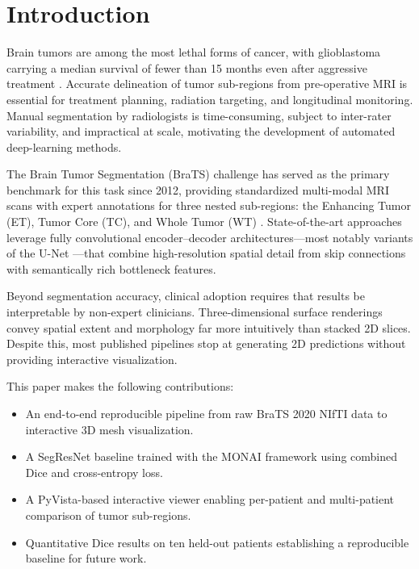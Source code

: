 \documentclass[conference]{IEEEtran}
\begin{document}
\section{Introduction}

Brain tumors are among the most lethal forms of cancer, with glioblastoma
carrying a median survival of fewer than 15 months even after aggressive
treatment \cite{stupp2005}. Accurate delineation of tumor sub-regions
from pre-operative MRI is essential for treatment planning, radiation
targeting, and longitudinal monitoring. Manual segmentation by radiologists
is time-consuming, subject to inter-rater variability, and impractical at
scale, motivating the development of automated deep-learning methods.

The Brain Tumor Segmentation (BraTS) challenge has served as the primary
benchmark for this task since 2012, providing standardized multi-modal MRI
scans with expert annotations for three nested sub-regions: the Enhancing
Tumor (ET), Tumor Core (TC), and Whole Tumor (WT) \cite{brats2020menze,brats2015}.
State-of-the-art approaches leverage fully convolutional encoder--decoder
architectures---most notably variants of the U-Net \cite{ronneberger2015}---that
combine high-resolution spatial detail from skip connections with
semantically rich bottleneck features.

Beyond segmentation accuracy, clinical adoption requires that results be
interpretable by non-expert clinicians. Three-dimensional surface renderings
convey spatial extent and morphology far more intuitively than stacked 2D
slices. Despite this, most published pipelines stop at generating 2D
predictions without providing interactive visualization.

This paper makes the following contributions:
\begin{itemize}
  \item An end-to-end reproducible pipeline from raw BraTS 2020 NIfTI data
        to interactive 3D mesh visualization.
  \item A SegResNet baseline trained with the MONAI framework using combined
        Dice and cross-entropy loss.
  \item A PyVista-based interactive viewer enabling per-patient and
        multi-patient comparison of tumor sub-regions.
  \item Quantitative Dice results on ten held-out patients establishing a
        reproducible baseline for future work.
\end{itemize}
\end{document}
